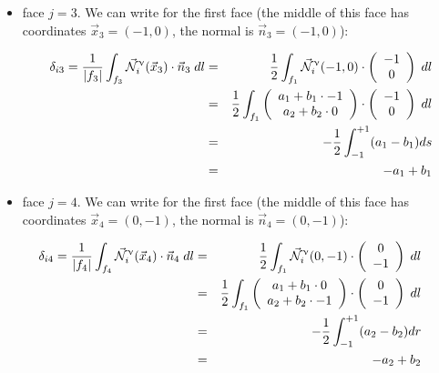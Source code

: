 \begin{itemize}
\item face $j=3$. We can write for the first face (the middle of this face has coordinates 
$\vec{x}_3=(-1,0)$, the normal is $\vec{n}_3=(-1,0)$):


\begin{eqnarray}
\delta_{i3}=
\frac{1}{|f_3|} \int_{f_3}
\vec{{\mathcal{N}}}^\upnu_i( \vec{x}_3) \cdot \vec{n}_3 \; dl
&=&\frac12  \int_{f_1} \vec{{\mathcal{N}}}^\upnu_i( -1,0) \cdot 
\left(\begin{array}{c} -1 \\ 0 \end{array}\right) \; dl \nonumber\\
&=& \frac12\int_{f_1} 
\left(\begin{array}{c} a_1+b_1\cdot -1 \\ a_2 + b_2 \cdot 0 \end{array}\right)
\cdot \left(\begin{array}{c} -1 \\ 0 \end{array}\right) \; dl \nonumber\\
&=& -\frac12 \int_{-1}^{+1} (a_1-b_1) ds \nonumber\\
&=& -a_1+b_1
\end{eqnarray}




\item face $j=4$. We can write for the first face (the middle of this face has coordinates 
$\vec{x}_4=(0,-1)$, the normal is $\vec{n}_4=(0,-1)$):
\end{itemize}

\begin{eqnarray}
\delta_{i4}=
\frac{1}{|f_4|} \int_{f_4}
\vec{{\mathcal{N}}}^\upnu_i( \vec{x}_4) \cdot \vec{n}_4 \; dl
&=&\frac12  \int_{f_1} \vec{{\mathcal{N}}}^\upnu_i( 0,-1) \cdot 
\left(\begin{array}{c} 0 \\ -1 \end{array}\right) \; dl \nonumber\\
&=& \frac12\int_{f_1} 
\left(\begin{array}{c} a_1+b_1\cdot 0 \\ a_2 + b_2 \cdot -1 \end{array}\right)
\cdot \left(\begin{array}{c} 0 \\ -1 \end{array}\right) \; dl \nonumber\\
&=& -\frac12 \int_{-1}^{+1} (a_2-b_2) dr \nonumber\\
&=& -a_2+b_2
\end{eqnarray}



